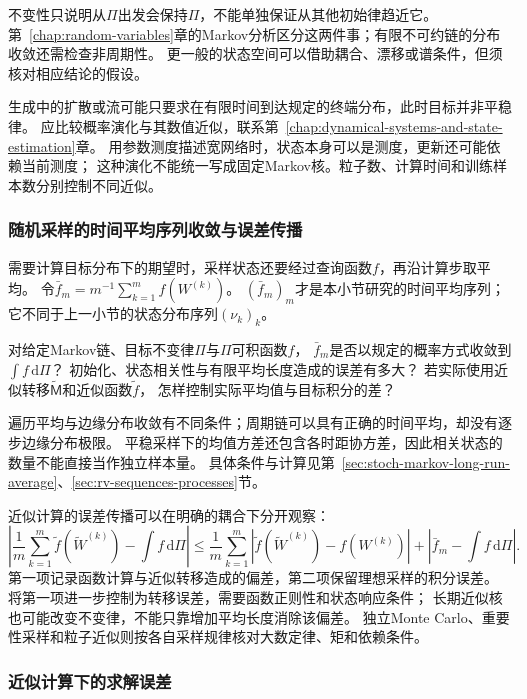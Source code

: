 不变性只说明从$\Pi$出发会保持$\Pi$，不能单独保证从其他初始律趋近它。
第~\ref{chap:random-variables}章的Markov分析区分这两件事；有限不可约链的分布收敛还需检查非周期性。
更一般的状态空间可以借助耦合、漂移或谱条件，但须核对相应结论的假设。

生成中的扩散或流可能只要求在有限时间到达规定的终端分布，此时目标并非平稳律。
应比较概率演化与其数值近似，联系第~\ref{chap:dynamical-systems-and-state-estimation}章。
用参数测度描述宽网络时，状态本身可以是测度，更新还可能依赖当前测度；
这种演化不能统一写成固定Markov核。粒子数、计算时间和训练样本数分别控制不同近似。

\subsubsection{随机采样的时间平均序列收敛与误差传播}
\label{sec:future-analysis-sampling-average}

需要计算目标分布下的期望时，采样状态还要经过查询函数$f$，再沿计算步取平均。
令$\bar f_m=m^{-1}\sum_{k=1}^m f(W^{(k)})$。
$(\bar f_m)_m$才是本小节研究的时间平均序列；它不同于上一小节的状态分布序列$(\nu_k)_k$。

\begin{mathproblem}[采样时间平均的积分误差]
  \label{question:future-sampling-average}
  对给定Markov链、目标不变律$\Pi$与$\Pi$可积函数$f$，
  $\bar f_m$是否以规定的概率方式收敛到$\int f\,\mathrm d\Pi$？
  初始化、状态相关性与有限平均长度造成的误差有多大？
  若实际使用近似转移$\widetilde{\mathsf M}$和近似函数$\widetilde f$，
  怎样控制实际平均值与目标积分的差？
\end{mathproblem}

遍历平均与边缘分布收敛有不同条件；周期链可以具有正确的时间平均，却没有逐步边缘分布极限。
平稳采样下的均值方差还包含各时距协方差，因此相关状态的数量不能直接当作独立样本量。
具体条件与计算见第~\ref{sec:stoch-markov-long-run-average}、\ref{sec:rv-sequences-processes}节。

近似计算的误差传播可以在明确的耦合下分开观察：
\[
  \left|\frac1m\sum_{k=1}^m\widetilde f(\widetilde W^{(k)})-\int f\,\mathrm d\Pi\right|
  \leq\frac1m\sum_{k=1}^m
    |\widetilde f(\widetilde W^{(k)})-f(W^{(k)})|
    +\left|\bar f_m-\int f\,\mathrm d\Pi\right|.
\]
第一项记录函数计算与近似转移造成的偏差，第二项保留理想采样的积分误差。
将第一项进一步控制为转移误差，需要函数正则性和状态响应条件；
长期近似核也可能改变不变律，不能只靠增加平均长度消除该偏差。
独立Monte Carlo、重要性采样和粒子近似则按各自采样规律核对大数定律、矩和依赖条件。

\subsubsection{近似计算下的求解误差}
\label{sec:future-analysis-computation}

